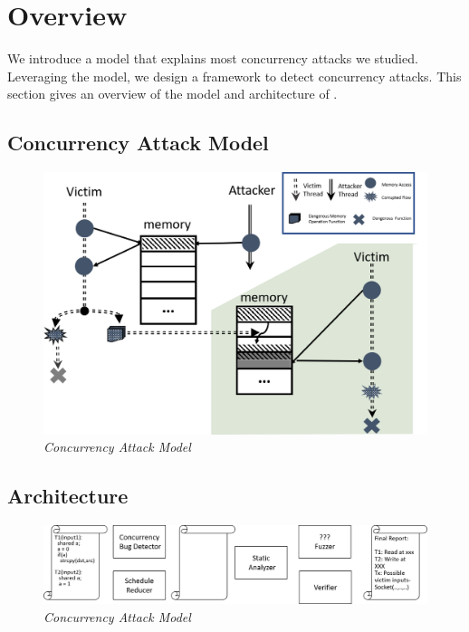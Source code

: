
\section{Overview}\label{sec:overview}
We introduce a model that explains most concurrency attacks we studied. 
Leveraging the model, we design a framework \xxx
to detect concurrency attacks. 
This section gives an overview of the model and architecture of \xxx.

\subsection{Concurrency Attack Model}

\begin{figure}[h]
	\centering
	\includegraphics[width=1\columnwidth]{figures/model}
	\vspace{-.25in}
	\caption{{\em Concurrency Attack Model}} 
	\label{fig:model}
	\vspace{-0.1in}
\end{figure}




\subsection{Architecture}
\begin{figure}[h]
	\centering
	\includegraphics[width=1.8\columnwidth]{figures/archi}
	\vspace{0in}
	\caption{{\em Concurrency Attack Model}} 
	\label{fig:model}
	\vspace{-0.1in}
\end{figure}



